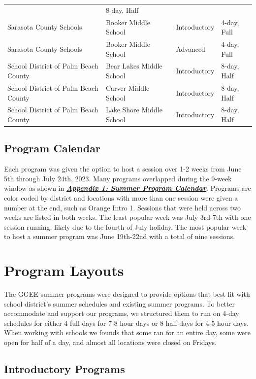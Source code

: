 \documentclass[
]{article}
\begin{document}
\begin{longtable}[]{@{}llll@{}}
& 8-day, Half \\
Sarasota County Schools & Booker Middle School & Introductory & 4-day,
Full \\
Sarasota County Schools & Booker Middle School & Advanced & 4-day,
Full \\
School District of Palm Beach County & Bear Lakes Middle School &
Introductory & 8-day, Half \\
School District of Palm Beach County & Carver Middle School &
Introductory & 8-day, Half \\
School District of Palm Beach County & Lake Shore Middle School &
Introductory & 8-day, Half \\
\end{longtable}

\hypertarget{program-calendar}{%
\subsection{Program Calendar}\label{program-calendar}}

Each program was given the option to host a session over 1-2 weeks from
June 5th through July 24th, 2023. Many programs overlapped during the
9-week window as shown in
\textbf{\emph{\protect\hyperlink{appendix-1-summer-program-calendar}{Appendix
1: Summer Program Calendar}}}. Programs are color coded by district and
locations with more than one session were given a number at the end,
such as Orange Intro 1. Sessions that were held across two weeks are
listed in both weeks. The least popular week was July 3rd-7th with one
session running, likely due to the fourth of July holiday. The most
popular week to host a summer program was June 19th-22nd with a total of
nine sessions.

\hypertarget{program-layouts}{%
\section{Program Layouts}\label{program-layouts}}

The GGEE summer programs were designed to provide options that best fit
with school district's summer schedules and existing summer programs. To
better accommodate and support our programs, we structured them to run
on 4-day schedules for either 4 full-days for 7-8 hour days or 8
half-days for 4-5 hour days. When working with schools we founds that
some ran for an entire day, some were open for half of a day, and almost
all locations were closed on Fridays.

\hypertarget{introductory-programs}{%
\subsection{Introductory Programs}\label{introductory-programs}}
\end{document}
